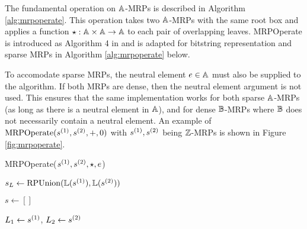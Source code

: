 \documentclass[../mrp.tex]{subfiles}
\begin{document}
  
  The fundamental operation on $\mathbb{A}$-MRPs is described in Algorithm \ref{alg:mrpoperate}.
  This operation takes two $\mathbb{A}$-MRPs with the same root box and
  applies a function $\star: \mathbb{A} \times \mathbb{A} \to \mathbb{A}$ to each pair of overlapping leaves.
  MRPOperate is introduced as Algorithm 4 in \cite{mrp-raaz-harlow-tucker} and 
  is adapted for bitstring representation and sparse MRPs in 
  Algorithm \ref{alg:mrpoperate} below.

  To accomodate sparse MRPs, the neutral element $e \in \mathbb{A}$ must also be supplied to the algorithm.
  If both MRPs are dense, then the neutral element argument is not used.
  This ensures that the same implementation works for both sparse $\mathbb{A}$-MRPs (as long as there is a neutral element in $\mathbb{A}$), and for dense $\mathbb{B}$-MRPs where $\mathbb{B}$ does not necessarily contain a neutral element.
  An example of $\mathrm{MRPOperate}(s ^{(1)}, s ^{(2)}, +, 0)$ with $s ^{(1)}, s ^{(2)}$ being $\mathbb{Z}$-MRPs is shown in Figure \ref{fig:mrpoperate}.

  \begin{algorithm}
    \caption{MRPOperate($s ^{(1)}, s ^{(2)}, \star, e$)}
    \label{alg:mrpoperate}

    $s_L \gets \mathrm{RPUnion}(\mathbb{L}(s ^{(1)}), \mathbb{L}(s ^{(2)}))$

    $s \gets []$
    
    $L_1 \gets s ^{(1)}$,
    $L_2 \gets s ^{(2)}$



  \end{algorithm}

  
\end{document}
